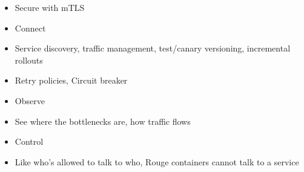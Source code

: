 \documentclass[12pt]{beamer}
\begin{document}
\begin{frame}
\begin{columns}
                    \begin{itemize}
                        \pause
                        \item Secure with mTLS
                        \pause
                        \item Connect
                        \pause
                        \item Service discovery, traffic management, test/canary versioning, incremental rollouts 
                        \pause
                        \item Retry policies, Circuit breaker
                        \pause
                        \item Observe
                        \pause
                        \item See where the bottlenecks are, how traffic flows
                        \pause
                        \item Control
                        \pause
                        \item Like who's allowed to talk to who, Rouge containers cannot talk to a service
                    \end{itemize}
            \end{columns}
        \end{frame}
\end{document}
